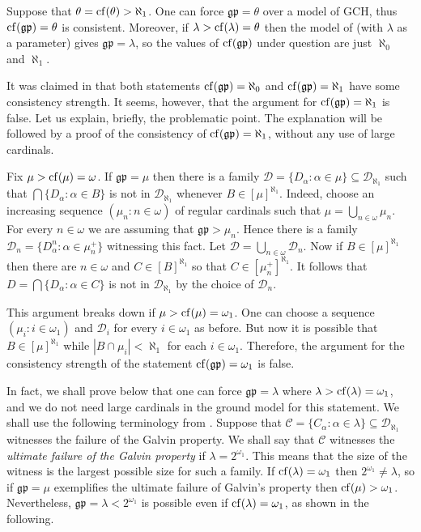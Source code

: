 \documentclass[11pt]{amsart}
\theoremstyle{definition}
\theoremstyle{remark}
\newcommand{\cf}{{\rm cf}}
\begin{document}
Suppose that $\theta=\cf(\theta)>\aleph_1$.
One can force $\mathfrak{gp}=\theta$ over a model of \textsf{GCH}, thus $\cf(\mathfrak{gp})=\theta$ is consistent.
Moreover, if $\lambda>\cf(\lambda)=\theta$ then the model of \cite{MR830084} (with $\lambda$ as a parameter) gives $\mathfrak{gp}=\lambda$, so the values of $\cf(\mathfrak{gp})$ under question are just $\aleph_0$ and $\aleph_1$.

It was claimed in \cite{MR4423479} that both statements $\cf(\mathfrak{gp})=\aleph_0$ and $\cf(\mathfrak{gp})=\aleph_1$ have some consistency strength.
It seems, however, that the argument for $\cf(\mathfrak{gp})=\aleph_1$ is false.
Let us explain, briefly, the problematic point.
The explanation will be followed by a proof of the consistency of $\cf(\mathfrak{gp})=\aleph_1$, without any use of large cardinals.

Fix $\mu>\cf(\mu)=\omega$.
If $\mathfrak{gp}=\mu$ then there is a family $\mathcal{D}=\{D_\alpha:\alpha\in\mu\}\subseteq\mathscr{D}_{\aleph_1}$ such that $\bigcap\{D_\alpha:\alpha\in{B}\}$ is not in $\mathscr{D}_{\aleph_1}$ whenever $B\in[\mu]^{\aleph_1}$.
Indeed, choose an increasing sequence $(\mu_n:n\in\omega)$ of regular cardinals such that $\mu=\bigcup_{n\in\omega}\mu_n$.
For every $n\in\omega$ we are assuming that $\mathfrak{gp}>\mu_n$.
Hence there is a family $\mathcal{D}_n=\{D^n_\alpha:\alpha\in\mu_n^+\}$ witnessing this fact.
Let $\mathcal{D}=\bigcup_{n\in\omega}\mathcal{D}_n$.
Now if $B\in[\mu]^{\aleph_1}$ then there are $n\in\omega$ and $C\in[B]^{\aleph_1}$ so that $C\in[\mu_n^+]^{\aleph_1}$.
It follows that $D=\bigcap\{D_\alpha:\alpha\in{C}\}$ is not in $\mathscr{D}_{\aleph_1}$ by the choice of $\mathcal{D}_n$.

This argument breaks down if $\mu>\cf(\mu)=\omega_1$.
One can choose a sequence $(\mu_i:i\in\omega_1)$ and $\mathcal{D}_i$ for every $i\in\omega_1$ as before.
But now it is possible that $B\in[\mu]^{\aleph_1}$ while $|B\cap\mu_i|<\aleph_1$ for each $i\in\omega_1$.
Therefore, the argument for the consistency strength of the statement $\cf(\mathfrak{gp})=\omega_1$ is false.

In fact, we shall prove below that one can force $\mathfrak{gp}=\lambda$ where $\lambda>\cf(\lambda)=\omega_1$, and we do not need large cardinals in the ground model for this statement.
We shall use the following terminology from \cite{MR4611828}.
Suppose that $\mathcal{C}=\{C_\alpha:\alpha\in\lambda\}\subseteq\mathscr{D}_{\aleph_1}$ witnesses the failure of the Galvin property.
We shall say that $\mathcal{C}$ witnesses the \emph{ultimate failure of the Galvin property} if $\lambda=2^{\omega_1}$.
This means that the size of the witness is the largest possible size for such a family.
If $\cf(\lambda)=\omega_1$ then $2^{\omega_1}\neq\lambda$, so if $\mathfrak{gp}=\mu$ exemplifies the ultimate failure of Galvin's property then $\cf(\mu)>\omega_1$.
Nevertheless, $\mathfrak{gp}=\lambda<2^{\omega_1}$ is possible even if $\cf(\lambda)=\omega_1$, as shown in the following.
\end{document}
